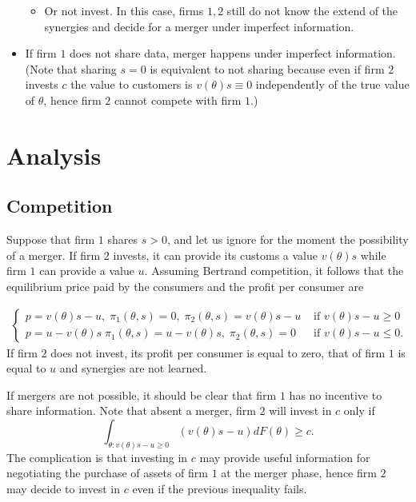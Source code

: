 \documentclass[a4paper,leqno]{article}%
\renewcommand{\t}{\theta}
\begin{document}
\begin{itemize}
\begin{itemize}
        \item Or not invest. In this case, firms $1,2$ still do not know the extend of the synergies and decide for a merger under imperfect information.
    \end{itemize}
    \item If firm $1$ does not share data, merger happens under imperfect information. (Note that sharing $s=0$ is equivalent to not sharing because even if firm $2$ invests $c$ the value to customers is $v(\t)s\equiv 0$ independently of the true value of $\t$, hence firm $2$ cannot compete with firm $1$.)
\end{itemize}


\section{Analysis}

\subsection{Competition}

Suppose that firm $1$ shares $s>0$, and let us ignore for the moment the possibility of a merger. If firm $2$ invests, it can provide its customs a value $v(\t)s$ while firm $1$ can provide a value $u$. Assuming Bertrand competition, it follows that the equilibrium price paid by the consumers and the profit per consumer are

\begin{align}\label{comp}
\begin{cases}
    p=v(\t)s-u,\; \pi_1(\t,s)=0,\; \pi_2(\t,s)=v(\t)s-u & \text{ if }v(\t)s-u\geq 0\\ 
    p=u-v(\t)s\; \pi_1(\t,s)=u-v(\t)s,\; \pi_2(\t,s)=0 & \text{ if }v(\t)s-u\leq 0.
\end{cases}
\end{align}
If firm $2$ does not invest, its profit per consumer is equal to zero, that of firm $1$ is equal to $u$ and synergies are not learned.

If mergers are not possible, it should be clear that firm $1$ has no incentive to share information. Note that absent a merger, firm $2$ will invest in $c$ only if 
%
\[
\int_{\t:v(\t)s-u\geq 0}(v(\t)s-u) dF(\t)\geq c.
\]
The complication is that investing in $c$ may provide useful information for negotiating the purchase of assets of firm $1$ at the merger phase, hence firm $2$ may decide to invest in $c$ even if the previous inequality fails.
\end{document}
